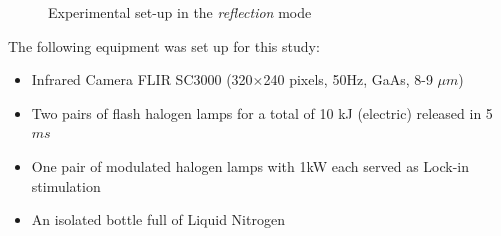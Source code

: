 \documentclass[]{spie}  %
\begin{document}
\begin{figure}[ht]
   \centering
   \caption{Experimental set-up in the \textit{reflection} mode}
   \label{Exp_setup}
\end{figure}

The following equipment was set up for this study:
\begin{itemize}
   \item Infrared Camera FLIR SC3000 (320$\times$240 pixels, 50Hz, GaAs, 8-9 $\mu m$)
   \item Two pairs of flash halogen lamps for a total of 10 kJ (electric) released in 5 $ms$ 
   \item One pair of modulated halogen lamps with 1kW each served as Lock-in stimulation
   \item An isolated bottle full of Liquid Nitrogen
\end{itemize}
\end{document}
